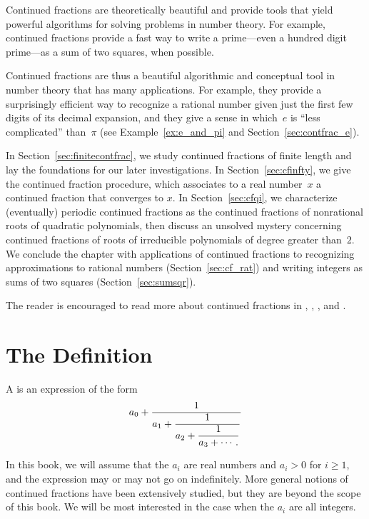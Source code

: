 Continued fractions are theoretically beautiful and provide tools
that yield powerful algorithms for solving problems in number theory.
For example, continued fractions provide a fast way to write a
prime---even a hundred digit prime---as a sum of two squares, when
possible.

Continued fractions are thus a beautiful algorithmic and conceptual tool
in number theory that has many applications.  For example, they
provide a surprisingly efficient way to recognize a rational number
given just the first few digits of its decimal expansion, and they
give a sense in which~$e$ is ``less complicated'' than~$\pi$ (see
Example~\ref{ex:e_and_pi} and Section~\ref{sec:contfrac_e}).


In Section~\ref{sec:finitecontfrac}, we study continued fractions of
finite length and lay the foundations for our later investigations.
In Section~\ref{sec:cfinfty}, we give the continued fraction procedure,
which associates to a real number~$x$ a continued fraction that
converges to $x$.  In Section~\ref{sec:cfqi}, we characterize
(eventually) periodic continued fractions as the continued fractions
of nonrational roots of quadratic polynomials, then discuss an
unsolved mystery concerning continued fractions of roots of
irreducible polynomials of degree greater than~$2$.  We conclude the
chapter with applications of continued fractions to recognizing
approximations to rational numbers (Section~\ref{sec:cf_rat}) and
writing integers as sums of two squares (Section~\ref{sec:sumsqr}).

The reader is encouraged to read more about continued fractions
in \cite[Ch.~X]{hardywright}, \cite{khintchine},
\cite[\S13.3]{burton}, and \cite[Ch.~7]{niven-zuckerman-montgomery}.

\section{The Definition}
A 
is an expression of the form
$$
  a_0 + \frac{1}{\displaystyle a_1+\frac{1}{\displaystyle a_2+\frac{1}{\displaystyle a_3+\cdots.}}}
$$

In this book, we will assume that the $a_i$ are real numbers and
$a_i>0$ for $i\geq 1$, and the expression may or may not go on
indefinitely.  More general notions of continued fractions have been
extensively studied, but they are beyond the scope of this book.
We will be most interested in the case when the $a_i$ are all
integers.

